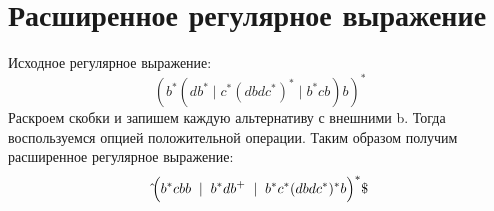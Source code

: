 \documentclass[a4paper, 14pt]{extarticle}
\begin{document}
\section{Расширенное регулярное выражение}
Исходное регулярное выражение: \[(b^{*}(db^{*}\mid c^{*}(dbdc^{*})^{*}\mid b^{*}cb)b)^{*}\]
Раскроем скобки и запишем каждую альтернативу с внешними b. Тогда воспользуемся опцией положительной операции. Таким образом получим расширенное регулярное выражение:
\[
\hat{}
\Bigl(
  b^{*}cbb
  \;\mid\;
  b^{*}db^+
  \;\mid\;
  b^{*}c^{*}(dbdc^{*})^{*}b
\Bigr)^*
\$
\]
\end{document}
